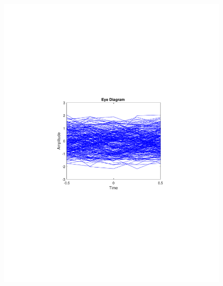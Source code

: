 \begin{refsection}
\begin{figure}[H]
\begin{minipage}{0.30\textwidth}
		\includegraphics[clip, trim=4cm 8cm 4cm 8cm, width=1\textwidth]{./sdf/m_qam_system/figures/expResults/homodyne/2_eye_4GBdInSig13dBc_AfMF.pdf}
		\label{fig:4GBdSpecMF}
	\end{minipage}
	\begin{minipage}{0.30\textwidth}
		\centering

\end{minipage}
\end{figure}
\end{refsection}
